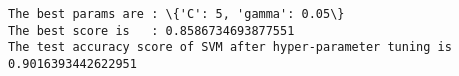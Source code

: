 \documentclass[11pt]{article}
\makeatletter
\newcommand{\boxspacing}{\kern\kvtcb@left@rule\kern\kvtcb@boxsep}
\newcommand{\prompt}[4]{
        {\ttfamily\llap{{\color{#2}[#3]:\hspace{3pt}#4}}\vspace{-\baselineskip}}
    }
\makeatother
\begin{document}
    \begin{Verbatim}[commandchars=\\\{\}]
The best params are : \{'C': 5, 'gamma': 0.05\}
The best score is   : 0.8586734693877551
The test accuracy score of SVM after hyper-parameter tuning is
0.9016393442622951
    \end{Verbatim}

    \begin{tcolorbox}[breakable, size=fbox, boxrule=1pt, pad at break*=1mm,colback=cellbackground, colframe=cellborder]
\prompt{In}{incolor}{ }{\boxspacing}
\begin{Verbatim}[commandchars=\\\{\}]

\end{Verbatim}
\end{tcolorbox}


    
    
    
\end{document}
